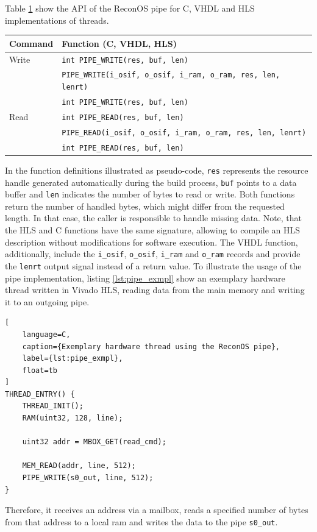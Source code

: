 Table \ref{tab:pipe_api} show the \ac{API} of the ReconOS pipe for C,
\ac{VHDL} and \ac{HLS} implementations of threads.
\begin{table}
	\centering
	\label{tab:pipe_api}
	\begin{tabular}{ll}
	\hline
	\textbf{Command} & \textbf{Function (C, \acs{VHDL}, \acs{HLS})}\\
	\hline
	Write & \lstinline{int PIPE_WRITE(res, buf, len)}\\
	& \lstinline{PIPE_WRITE(i_osif, o_osif, i_ram, o_ram, res, len, lenrt)}\\
	& \lstinline{int PIPE_WRITE(res, buf, len)}\\
	\hline
	Read & \lstinline{int PIPE_READ(res, buf, len)}\\
	& \lstinline{PIPE_READ(i_osif, o_osif, i_ram, o_ram, res, len, lenrt)}\\
	& \lstinline{int PIPE_READ(res, buf, len)}\\
	\hline
	\end{tabular}
\end{table}
In the function definitions illustrated as pseudo-code, \lstinline{res}
represents the resource handle generated automatically during the build
process, \lstinline{buf} points to a data buffer and \lstinline{len} indicates
the number of bytes to read or write. Both functions return the number of
handled bytes, which might differ from the requested length. In that case, the
caller is responsible to handle missing data. Note, that the \ac{HLS} and C
functions have the same signature, allowing to compile an \ac{HLS} description
without modifications for software execution. The \ac{VHDL} function,
additionally, include the \lstinline{i_osif}, \lstinline{o_osif},
\lstinline{i_ram} and \lstinline{o_ram} records and provide the
\lstinline{lenrt} output signal instead of a return value. To illustrate the
usage of the pipe implementation, listing \ref{lst:pipe_exmpl} show an
exemplary hardware thread written in Vivado HLS, reading data from the main
memory and writing it to an outgoing pipe.
\begin{lstlisting}[
	language=C,
	caption={Exemplary hardware thread using the ReconOS pipe},
	label={lst:pipe_exmpl},
	float=tb
]
THREAD_ENTRY() {
	THREAD_INIT();
	RAM(uint32, 128, line);

	uint32 addr = MBOX_GET(read_cmd);

	MEM_READ(addr, line, 512);
	PIPE_WRITE(s0_out, line, 512);
}
\end{lstlisting}
Therefore, it receives an address via a mailbox, reads a specified number of
bytes from that address to a local ram and writes the data to the pipe
\lstinline{s0_out}.


